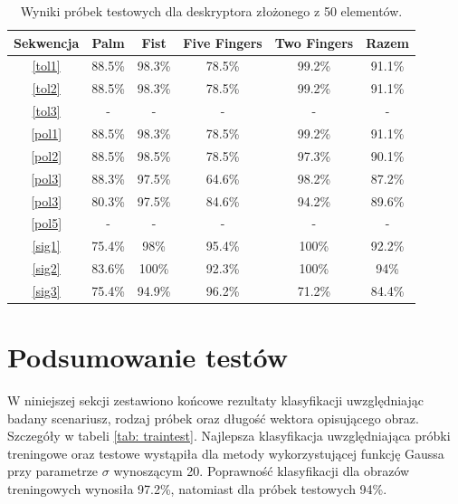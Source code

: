 \begin{table} [h!]
	\centering
	\begin{tabular}{|c|c|c|c|c|c|}
		\hline
		\textbf{Sekwencja} 	& \textbf{Palm} & \textbf{Fist} & \textbf{Five Fingers} & \textbf{Two Fingers} & \textbf{Razem} \\ \hline
		\ref{tol1} 	& 88.5\% 	& 98.3\%	& 78.5\%	& 99.2\% 	& 91.1\% \\ \hline
		\ref{tol2} 	& 88.5\% 	& 98.3\%	& 78.5\%	& 99.2\% 	& 91.1\% \\ \hline
		\ref{tol3}	& -			& -			& -			& - 		& - 	 \\ \hline \hline
		\ref{pol1} 	& 88.5\% 	& 98.3\%	& 78.5\%	& 99.2\% 	& 91.1\% \\ \hline
		\ref{pol2} 	& 88.5\% 	& 98.5\%	& 78.5\%	& 97.3\% 	& 90.1\% \\ \hline
		\ref{pol3}	& 88.3\%	& 97.5\%	& 64.6\%	& 98.2\% 	& 87.2\% \\ \hline
		\ref{pol3}	& 80.3\%	& 97.5\%	& 84.6\%	& 94.2\% 	& 89.6\% \\ \hline
		\ref{pol5}	& -			& -			& -			& - 		& - 	 \\ \hline \hline
		\ref{sig1}	& 75.4\% 	& 98\%		& 95.4\%	& 100\% 	& 92.2\% \\ \hline
		\ref{sig2}	& 83.6\% 	& 100\%		& 92.3\%	& 100\% 	& 94\% \\ \hline
		\ref{sig3}	& 75.4\%	& 94.9\%	& 96.2\%	& 71.2\% 	& 84.4\% \\ \hline
	\end{tabular}
	\caption{Wyniki próbek testowych dla deskryptora złożonego z 50 elementów.}
	\label{tab: test50}
\end{table}


\newpage

\section{Podsumowanie testów}
W niniejszej sekcji zestawiono końcowe rezultaty klasyfikacji uwzględniając badany scenariusz, rodzaj próbek oraz długość wektora opisującego obraz. Szczegóły w tabeli \ref{tab: traintest}.
Najlepsza klasyfikacja uwzględniająca próbki treningowe oraz testowe wystąpiła dla metody wykorzystującej funkcję Gaussa przy parametrze $\sigma$ wynoszącym 20. Poprawność klasyfikacji dla obrazów treningowych wynosiła 97.2\%, natomiast dla próbek testowych 94\%. 


